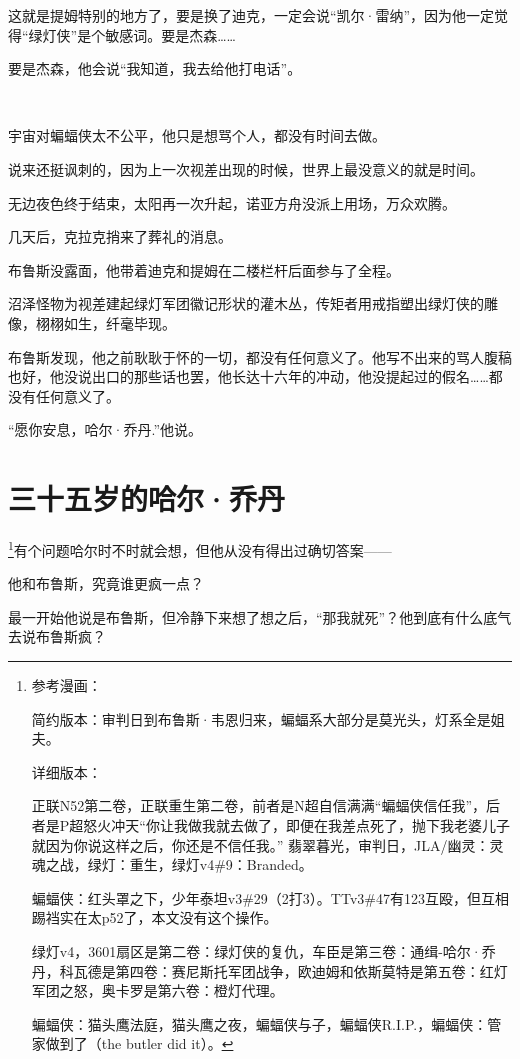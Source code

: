 \documentclass[../main]{subfiles}
\begin{document}
这就是提姆特别的地方了，要是换了迪克，一定会说“凯尔·雷纳”，因为他一定觉得“绿灯侠”是个敏感词。要是杰森……

要是杰森，他会说“我知道，我去给他打电话”。

~\

宇宙对蝙蝠侠太不公平，他只是想骂个人，都没有时间去做。

说来还挺讽刺的，因为上一次视差出现的时候，世界上最没意义的就是时间。

无边夜色终于结束，太阳再一次升起，诺亚方舟没派上用场，万众欢腾。

几天后，克拉克捎来了葬礼的消息。

布鲁斯没露面，他带着迪克和提姆在二楼栏杆后面参与了全程。

沼泽怪物为视差建起绿灯军团徽记形状的灌木丛，传矩者用戒指塑出绿灯侠的雕像，栩栩如生，纤毫毕现。

布鲁斯发现，他之前耿耿于怀的一切，都没有任何意义了。他写不出来的骂人腹稿也好，他没说出口的那些话也罢，他长达十六年的冲动，他没提起过的假名……都没有任何意义了。

“愿你安息，哈尔·乔丹.”他说。

\section{三十五岁的哈尔·乔丹}

\footnote[1]{参考漫画：

    简约版本：审判日到布鲁斯·韦恩归来，蝙蝠系大部分是莫光头，灯系全是姐夫。

    详细版本：

    正联N52第二卷，正联重生第二卷，前者是N超自信满满“蝙蝠侠信任我”，后者是P超怒火冲天“你让我做我就去做了，即便在我差点死了，抛下我老婆儿子就因为你说这样之后，你还是不信任我。”
    翡翠暮光，审判日，JLA/幽灵：灵魂之战，绿灯：重生，绿灯v4\#9：Branded。

    蝙蝠侠：红头罩之下，少年泰坦v3\#29（2打3）。TTv3\#47有123互殴，但互相踢裆实在太p52了，本文没有这个操作。

    绿灯v4，3601扇区是第二卷：绿灯侠的复仇，车臣是第三卷：通缉-哈尔·乔丹，科瓦德是第四卷：赛尼斯托军团战争，欧迪姆和依斯莫特是第五卷：红灯军团之怒，奥卡罗是第六卷：橙灯代理。

    蝙蝠侠：猫头鹰法庭，猫头鹰之夜，蝙蝠侠与子，蝙蝠侠R.I.P.，蝙蝠侠：管家做到了（the butler did it）。}有个问题哈尔时不时就会想，但他从没有得出过确切答案——

他和布鲁斯，究竟谁更疯一点？

最一开始他说是布鲁斯，但冷静下来想了想之后，“那我就死”？他到底有什么底气去说布鲁斯疯？
\end{document}
